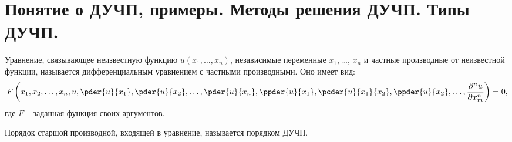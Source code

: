 \chapter{Понятие о ДУЧП, примеры. Методы решения ДУЧП. Типы ДУЧП.}

Уравнение, связывающее неизвестную функцию \( u(x_1, \ldots, x_n) \), независимые
переменные \( x_1 \), \ldots, \( x_n \) и частные производные от неизвестной
функции, называется дифференциальным уравнением с частными производными. Оно
имеет вид:
\[
    F\left(x_1, x_2, \ldots, x_n, u, \pder{u}{x_1}, \pder{u}{x_2}, \ldots,
    \pder{u}{x_n}, \ppder{u}{x_1}, \pcder{u}{x_1}{x_2}, \ppder{u}{x_2}, \ldots,
    \pnder{n}{u}{x_m}\right) = 0,
\]
где \( F \) -- заданная функция своих аргументов.

Порядок старшой производной, входящей в уравнение, называется порядком ДУЧП.

